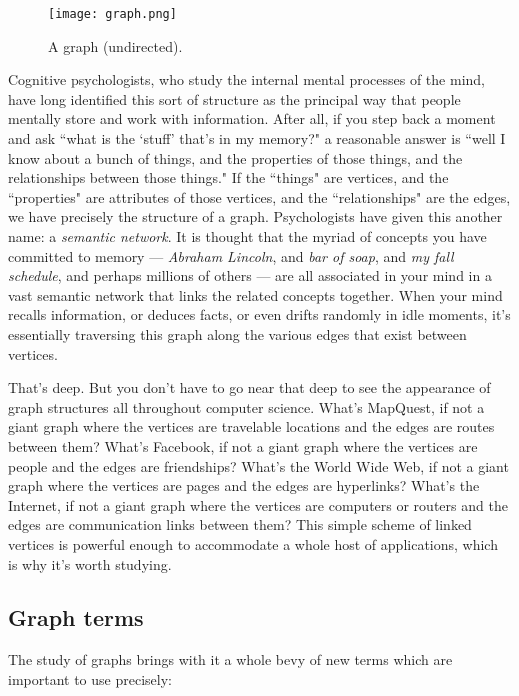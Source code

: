 \begin{figure}[ht]
\centering
\texttt{[image: graph.png]}
\caption{A graph (undirected).}
\label{graph}
\end{figure}

Cognitive psychologists, who study the internal mental processes of the
mind, have long identified this sort of structure as the principal way that
people mentally store and work with information. After all, if you step
back a moment and ask ``what is the `stuff' that's in my memory?" a
reasonable answer is ``well I know about a bunch of things, and the
properties of those things, and the relationships between those things." If
the ``things" are vertices, and the ``properties" are attributes of those
vertices, and the ``relationships" are the edges, we have precisely the
structure of a graph. Psychologists have given this another name: a
\textit{semantic network}. It is thought that the myriad of concepts you
have committed to memory --- \textsl{Abraham Lincoln}, and \textsl{bar of
soap}, and \textsl{my fall schedule}, and perhaps millions of others ---
are all associated in your mind in a vast semantic network that links the
related concepts together. When your mind recalls information, or deduces
facts, or even drifts randomly in idle moments, it's essentially traversing
this graph along the various edges that exist between vertices.

That's deep. But you don't have to go near that deep to see the appearance
of graph structures all throughout computer science. What's MapQuest, if
not a giant graph where the vertices are travelable locations and the edges
are routes between them? What's Facebook, if not a giant graph where the
vertices are people and the edges are friendships? What's the World Wide
Web, if not a giant graph where the vertices are pages and the edges are
hyperlinks? What's the Internet, if not a giant graph where the vertices
are computers or routers and the edges are communication links between
them? This simple scheme of linked vertices is powerful enough to
accommodate a whole host of applications, which is why it's worth studying.

\subsection{Graph terms}

The study of graphs brings with it a whole bevy of new terms which are
important to use precisely:

